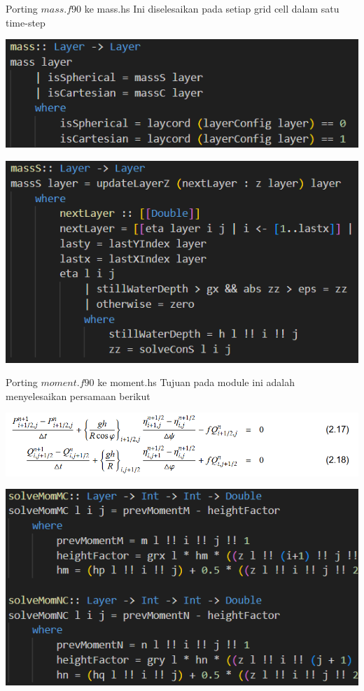 \documentclass{beamer}
\begin{document}
\begin{frame}{Porting $mass.f90$ ke mass.hs}
    Ini diselesaikan pada setiap grid cell dalam satu time-step
    \begin{center}
        \includegraphics[scale=0.5]{figure/mass1.png}
    \end{center}
    \begin{center}
        \includegraphics[scale=0.5]{figure/mass2.png}
    \end{center}
\end{frame}

\begin{frame}{Porting $moment.f90$ ke moment.hs}
    Tujuan pada module ini adalah menyelesaikan persamaan berikut
    \begin{center}
        \includegraphics[scale=0.4]{figure/moment.png}
    \end{center}
    \begin{center}
        \includegraphics[scale=0.5]{figure/moment1.png}
    \end{center}
\end{frame}
\end{document}
